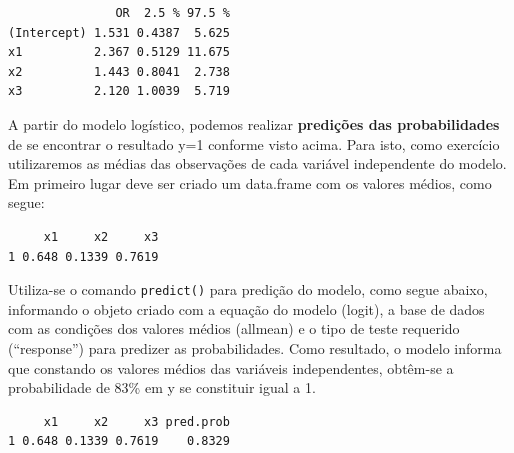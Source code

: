\documentclass[12pt,brazil,oneside]{book}
\newenvironment{Shaded}{\begin{snugshade}}{\end{snugshade}}
\newcommand{\DataTypeTok}[1]{\textcolor[rgb]{0.13,0.29,0.53}{#1}}
\newcommand{\KeywordTok}[1]{\textcolor[rgb]{0.13,0.29,0.53}{\textbf{#1}}}
\newcommand{\NormalTok}[1]{#1}
\newcommand{\OperatorTok}[1]{\textcolor[rgb]{0.81,0.36,0.00}{\textbf{#1}}}
\newcommand{\StringTok}[1]{\textcolor[rgb]{0.31,0.60,0.02}{#1}}
\begin{document}
\begin{verbatim}
               OR  2.5 % 97.5 %
(Intercept) 1.531 0.4387  5.625
x1          2.367 0.5129 11.675
x2          1.443 0.8041  2.738
x3          2.120 1.0039  5.719
\end{verbatim}

A partir do modelo logístico, podemos realizar \textbf{predições das probabilidades} de se encontrar o resultado y=1 conforme visto acima. Para isto, como exercício utilizaremos as médias das observações de cada variável independente do modelo. Em primeiro lugar deve ser criado um data.frame com os valores médios, como segue:

\begin{Shaded}
\end{Shaded}

\begin{verbatim}
     x1     x2     x3
1 0.648 0.1339 0.7619
\end{verbatim}

Utiliza-se o comando \texttt{predict()} para predição do modelo, como segue abaixo, informando o objeto criado com a equação do modelo (logit), a base de dados com as condições dos valores médios (allmean) e o tipo de teste requerido (``response'') para predizer as probabilidades. Como resultado, o modelo informa que constando os valores médios das variáveis independentes, obtêm-se a probabilidade de 83\% em y se constituir igual a 1.

\begin{Shaded}
\end{Shaded}

\begin{verbatim}
     x1     x2     x3 pred.prob
1 0.648 0.1339 0.7619    0.8329
\end{verbatim}
\end{document}
